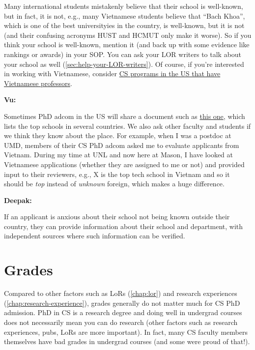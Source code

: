 \documentclass[oneside,11pt,dvipsnames]{book}
\newenvironment{commentbox}[1][]{
  \small
  \begin{mybox}
    {\small \textbf{#1}}
  }{
  \end{mybox}
}
\begin{document}
Many international students mistakenly believe that their school is well-known, but in fact, it is not, e.g., many Vietnamese students believe that ``Bach Khoa'', which is one of the best universityies in the country, is well-known, but it is not (and their confusing acronyms HUST and HCMUT only make it worse).  So if you think your school is well-known, mention it (and back up with some evidence like rankings or awards) in your SOP.  You can ask your LOR writers to talk about your school as well (\autoref{sec:help-your-LOR-writers}).
Of course, if you're interested in working with Vietnamese, consider  \href{https://github.com/dynaroars/dynaroars.github.io/wiki/Viet-CS-Profs-US}{CS programs in the US that have Vietnamese professors}. %

\begin{commentbox}[Vu:]
  Sometimes PhD adcom in the US will share a document such as \href{https://github.com/dynaroars/dynaroars.github.io/wiki/Foreign-Top-Schools}{this one}, which lists the top schools in several countries. We also ask other faculty and students if we think they know about the place.  For example, when I was a postdoc at UMD, members of their CS PhD adcom asked me to evaluate applicants from Vietnam.  During my time at UNL and now here at Mason, I have looked at Vietnamese applications (whether they are assigned to me or not) and provided input to their reviewers, e.g., X is the top tech school in Vietnam and so it should be \emph{top} instead of \emph{unknown} foreign, which makes a huge difference.
\end{commentbox}
\begin{commentbox}[Deepak:]
  If an applicant is anxious about their school not being known outside their country, they can provide information about their school and department, with independent sources where such information can be verified.
\end{commentbox}
\section{Grades}\label{sec:gpa}

Compared to other factors such as LoRs (\autoref{chap:lor}) and research experiences (\autoref{chap:research-experience}), grades generally do not matter much for CS PhD admission. PhD in CS is a research degree and doing well in undergrad courses does not necessarily mean you can do research (other factors such as research experiences, pubs, LoRs are more important).  In fact, many CS faculty members themselves have bad grades in undergrad courses (and some were proud of that!).
\end{document}
